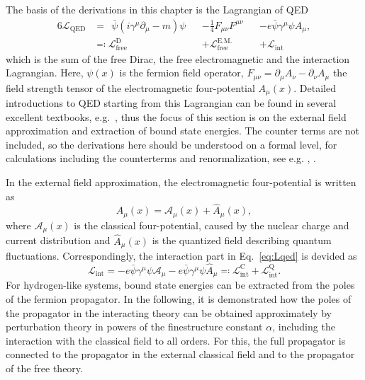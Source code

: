 The basis of the derivations in this chapter is the Lagrangian of QED
\begin{alignat}{6}
\label{eq:Lqed}
\mathcal{L}_{\text{QED}}&=\phantom{:}\bar{\psi}\left( i \gamma^\mu \partial_\mu -m  \right)\psi &&-\frac{1}{4}F_{\mu\nu}F^{\mu\nu}&&-e\bar{\psi}\gamma^\mu \psi A_\mu,\\
&\eqqcolon \mathcal{L}_{\text{free}}^{\text{D}} &&+ \mathcal{L}_{\text{free}}^{\text{E.M.}} &&+ \mathcal{L}_{\text{int}} \nonumber
\end{alignat}
which is the sum of the free Dirac, the free electromagnetic and the interaction Lagrangian. Here, $\psi(x)$ is the fermion field operator, $F_{\mu\nu}=\partial_\mu A_\nu - \partial_\nu A_\mu$ the field strength tensor of the electromagnetic four-potential $A_\mu(x)$. Detailed introductions to QED starting from this Lagrangian can be found in several excellent textbooks, e.g.~\cite{weinberg2005,itzykson2005,peskin1995}, thus the focus of this section is on the external field approximation and extraction of bound state energies. The counter terms are not included, so the derivations here should be understood on a formal level, for calculations including the counterterms and renormalization, see e.g. \cite[Section 14]{weinberg2005}, \cite{shabaev2002}.

In the external field approximation, the electromagnetic four-potential is written as
\begin{equation}
A_\mu(x) = \mathcal{A}_\mu(x) + \hat{A}_\mu(x),
\end{equation}
where $\mathcal{A}_\mu(x)$ is the classical four-potential, caused by the nuclear charge and current distribution and $\hat{A}_\mu(x)$ is the quantized field describing quantum fluctuations. Correspondingly, the interaction part in Eq.~\eqref{eq:Lqed} is devided as
\begin{equation}
\label{eq:Lint}
\mathcal{L}_{\text{int}}=-e\bar{\psi}\gamma^\mu \psi \mathcal{A}_\mu-e\bar{\psi}\gamma^\mu \psi \hat{A}_\mu\eqqcolon\mathcal{L}_{\text{int}}^{\text{C}} + \mathcal{L}_{\text{int}}^{\text{Q}}.
\end{equation}
For hydrogen-like systems, bound state energies can be extracted from the poles of the fermion propagator. In the following, it is demonstrated how the poles of the propagator in the interacting theory can be obtained approximately by perturbation theory in powers of the finestructure constant $\alpha$, including the interaction with the classical field to all orders. For this, the full propagator is connected to the propagator in the external classical field and to the propagator of the free theory.
